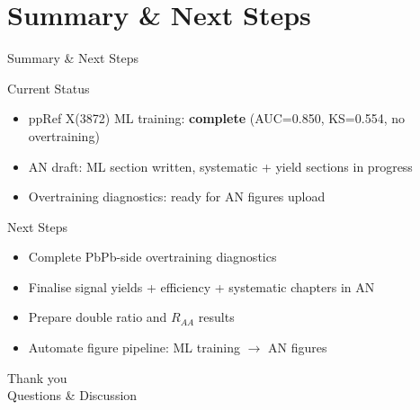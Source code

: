 \documentclass[11pt,aspectratio=169]{beamer}
\begin{document}
\section{Summary \& Next Steps}

\begin{frame}{Summary \& Next Steps}
  \begin{block}{Current Status}
    \begin{itemize}
      \item ppRef X(3872) ML training: \textbf{complete} (AUC=0.850, KS=0.554, no overtraining)
      \item AN draft: ML section written, systematic + yield sections in progress
      \item Overtraining diagnostics: ready for AN figures upload
    \end{itemize}
  \end{block}

  \begin{block}{Next Steps}
    \begin{itemize}
      \item Complete PbPb-side overtraining diagnostics
      \item Finalise signal yields + efficiency + systematic chapters in AN
      \item Prepare double ratio and $R_{AA}$ results
      \item Automate figure pipeline: ML training $\to$ AN figures
    \end{itemize}
  \end{block}
\end{frame}

\begin{frame}[plain]
  \begin{center}
    \Huge Thank you\\[0.5em]
    \Large Questions \& Discussion
  \end{center}
\end{frame}
\end{document}
